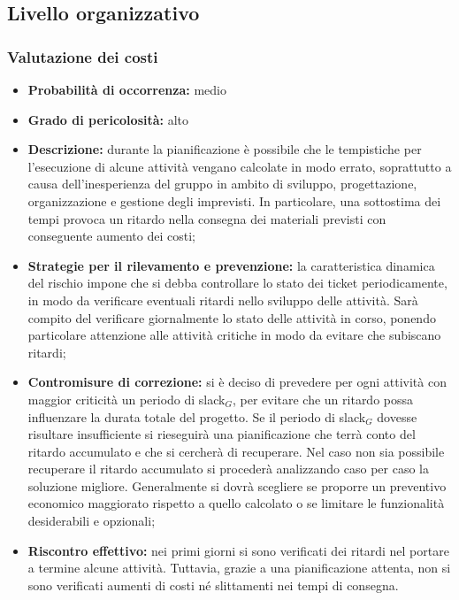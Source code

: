 \subsection{Livello organizzativo}

\subsubsection{Valutazione dei costi}
\hypertarget{subsubsect:costi}{}
\begin{itemize}
\item \textbf{Probabilità di occorrenza:} medio
\item \textbf{Grado di pericolosità:} alto
\item \textbf{Descrizione:} durante la pianificazione è possibile che le tempistiche per l'esecuzione di alcune attività vengano calcolate in modo errato, soprattutto a causa dell'inesperienza del gruppo in ambito di sviluppo, progettazione, organizzazione e gestione degli imprevisti. In particolare, una sottostima dei tempi provoca un ritardo nella consegna dei materiali previsti con conseguente aumento dei costi;

\item \textbf{Strategie per il rilevamento e prevenzione:} la caratteristica dinamica del rischio impone che si debba controllare lo stato dei ticket periodicamente, in modo da verificare eventuali ritardi nello sviluppo delle attività. Sarà compito del \ruoloResponsabile{} verificare giornalmente lo stato delle attività in corso, ponendo particolare attenzione alle attività critiche in modo da evitare che subiscano ritardi;


\item \textbf{Contromisure di correzione:} si è deciso di prevedere per ogni attività con maggior criticità un periodo di slack$_G$, per evitare che un ritardo possa influenzare la durata totale del progetto. Se il periodo di slack$_G$ dovesse risultare insufficiente si rieseguirà una pianificazione che terrà conto del ritardo accumulato e che si cercherà di recuperare. Nel caso non sia possibile recuperare il ritardo accumulato si procederà analizzando caso per caso la soluzione migliore. Generalmente si dovrà scegliere se proporre un preventivo economico maggiorato rispetto a quello calcolato o se limitare le funzionalità desiderabili e opzionali;

\item \textbf{Riscontro effettivo:} nei primi giorni si sono verificati dei ritardi nel portare a termine alcune attività. Tuttavia, grazie a una pianificazione attenta, non si sono verificati aumenti di costi né slittamenti nei tempi di consegna.

\end{itemize}



